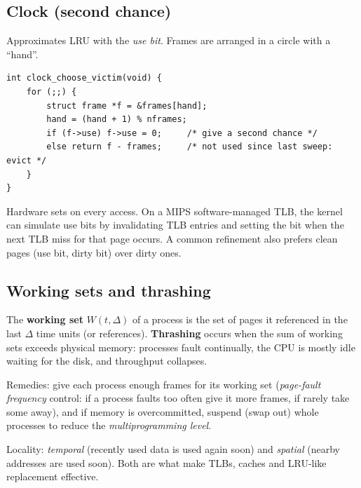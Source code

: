 \subsection{Clock (second chance)}
Approximates LRU with the \emph{use bit}. Frames are arranged in a circle with a ``hand''.
\begin{lstlisting}[style=c]
int clock_choose_victim(void) {
    for (;;) {
        struct frame *f = &frames[hand];
        hand = (hand + 1) % nframes;
        if (f->use) f->use = 0;     /* give a second chance */
        else return f - frames;     /* not used since last sweep: evict */
    }
}
\end{lstlisting}
Hardware sets  on every access. On a MIPS software-managed TLB, the kernel can
simulate use bits by invalidating TLB entries and setting the bit when the next TLB miss for
that page occurs. A common refinement also prefers clean pages (use bit, dirty bit) over dirty
ones.

\subsection{Working sets and thrashing}
\begin{definition}
The \textbf{working set} $W(t,\Delta)$ of a process is the set of pages it referenced in the last
$\Delta$ time units (or references). \textbf{Thrashing} occurs when the sum of working sets
exceeds physical memory: processes fault continually, the CPU is mostly idle waiting for the
disk, and throughput collapses.
\end{definition}
Remedies: give each process enough frames for its working set (\emph{page-fault frequency}
control: if a process faults too often give it more frames, if rarely take some away), and if
memory is overcommitted, suspend (swap out) whole processes to reduce the
\emph{multiprogramming level}.

\begin{aside}
Locality: \emph{temporal} (recently used data is used again soon) and \emph{spatial} (nearby
addresses are used soon). Both are what make TLBs, caches and LRU-like replacement effective.
\end{aside}

